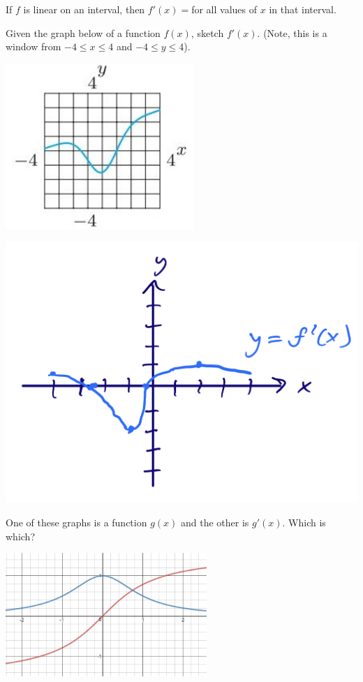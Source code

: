 \documentclass[11pt]{exam}
\begin{document}
\noindent
If $f$ is linear on an interval, then $f'(x) =$\fillin[constant] for all values of $x$ in that interval.
\begin{questions}
  \question  Given the graph below of a function $f(x)$, sketch
    $f'(x)$. (Note, this is a window from \(-4 \leq x \leq 4\) and
    \(-4 \leq y \leq 4\)).

    \includegraphics[width=2.8in]{Figures/deriv.jpg}
    \begin{solution}
     \includegraphics[scale=0.3]{Figures/no1sketch} 
    \end{solution}
  \question One of these graphs is a function $g(x)$ and the other is $g'(x)$.  Which is which?

    \includegraphics[width=3in]{Figures/arctan.jpg}	


\end{questions}
\end{document}
